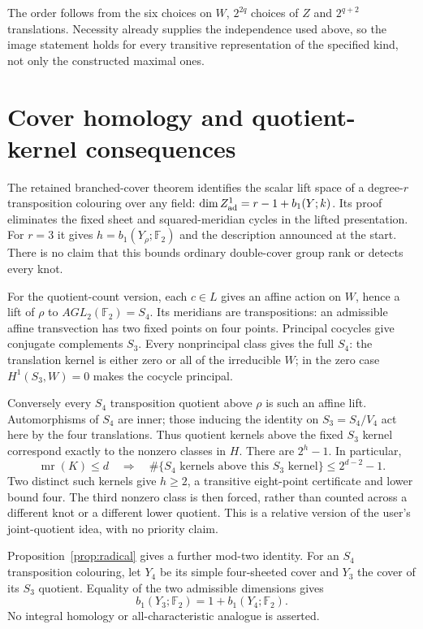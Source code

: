 \documentclass[11pt]{article}
\newcommand{\F}{\mathbb F}
\newcommand{\mr}{\operatorname{mr}}
\begin{document}
The order follows from the six choices on $W$, $2^{2q}$ choices
of $Z$ and $2^{q+2}$ translations. Necessity already supplies
the independence used above, so the image statement holds for
every transitive representation of the specified kind, not only
the constructed maximal ones.

\section{Cover homology and quotient-kernel consequences}

The retained branched-cover theorem identifies the scalar lift
space of a degree-$r$ transposition colouring over any field:
$\dim Z^1_{\rm ad}=r-1+b_1(Y;k)$. Its proof eliminates the fixed
sheet and squared-meridian cycles in the lifted presentation.
For $r=3$ it gives $h=b_1(Y_\rho;\F_2)$ and the description
announced at the start. There is no claim that this bounds
ordinary double-cover group rank or detects every knot.

For the quotient-count version, each $c\in L$ gives an affine
action on $W$, hence a lift of $\rho$ to
$AGL_2(\F_2)=S_4$. Its meridians are transpositions: an
admissible affine transvection has two fixed points on four
points. Principal cocycles give conjugate complements $S_3$.
Every nonprincipal class gives the full $S_4$: the translation
kernel is either zero or all of the irreducible $W$; in the
zero case $H^1(S_3,W)=0$ makes the cocycle principal.

Conversely every $S_4$ transposition quotient above $\rho$ is
such an affine lift. Automorphisms of $S_4$ are inner; those
inducing the identity on $S_3=S_4/V_4$ act here by the four
translations. Thus quotient kernels above the fixed $S_3$
kernel correspond exactly to the nonzero classes in $H$.
There are $2^h-1$. In particular,
\[
 \mr(K)\le d\quad\Longrightarrow\quad
 \#\{S_4\text{ kernels above this }S_3\text{ kernel}\}
                         \le 2^{d-2}-1.
\]
Two distinct such kernels give $h\ge2$, a transitive
eight-point certificate and lower bound four. The third
nonzero class is then forced, rather than counted across a
different knot or a different lower quotient. This is a
relative version of the user's joint-quotient idea, with no
priority claim.

Proposition~\ref{prop:radical} gives a further mod-two identity.
For an $S_4$ transposition colouring, let $Y_4$ be its simple
four-sheeted cover and $Y_3$ the cover of its $S_3$ quotient.
Equality of the two admissible dimensions gives
\[
                   b_1(Y_3;\F_2)=1+b_1(Y_4;\F_2).
\]
No integral homology or all-characteristic analogue is asserted.
\end{document}
